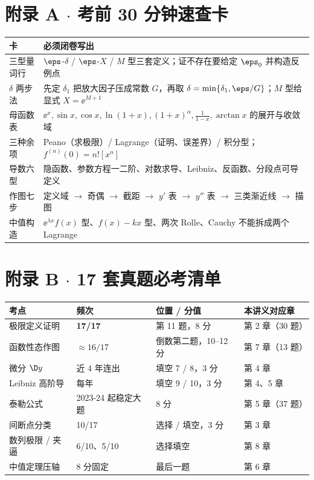 \newpage
\section*{附录 A $\cdot$ 考前 30 分钟速查卡}
{\footnotesize
\begin{longtable}{@{}p{3.0cm}p{12.2cm}@{}}
\toprule
\textbf{卡} & \textbf{必须闭卷写出} \\
\midrule
三型量词行 & $\eps$-$\delta$ / $\eps$-$X$ / $M$ 型三套定义；证不存在要给定 $\eps_0$ 并构造反例点 \\
$\delta$ 两步法 & 先定 $\delta_1$ 把放大因子压成常数 $G$，再取 $\delta=\min\{\delta_1,\eps/G\}$；$M$ 型给显式 $X=\ee^{M+1}$ \\
母函数表 & $\ee^x,\sin x,\cos x,\ln(1+x),(1+x)^\alpha,\frac1{1-x},\arctan x$ 的展开与收敛域 \\
三种余项 & Peano（求极限）/ Lagrange（证明、误差界）/ 积分型；$f^{(n)}(0)=n![x^n]$ \\
导数六型 & 隐函数、参数方程一二阶、对数求导、Leibniz、反函数、分段点可导定义 \\
作图七步 & 定义域 $\to$ 奇偶 $\to$ 截距 $\to$ $y'$ 表 $\to$ $y''$ 表 $\to$ 三类渐近线 $\to$ 描图 \\
中值构造 & $\ee^{\lambda x}f(x)$ 型、$f(x)-kx$ 型、两次 Rolle、Cauchy 不能拆成两个 Lagrange \\
\bottomrule
\end{longtable}}

\section*{附录 B $\cdot$ 17 套真题必考清单}
{\footnotesize
\begin{longtable}{@{}p{3.4cm}p{2.1cm}p{3.0cm}p{6.7cm}@{}}
\toprule
\textbf{考点} & \textbf{频次} & \textbf{位置 / 分值} & \textbf{本讲义对应章} \\
\midrule
极限定义证明 & \textbf{17/17} & 第 11 题，8 分 & 第 2 章（30 题） \\
函数性态作图 & $\approx16/17$ & 倒数第二题，10--12 分 & 第 7 章（13 题） \\
微分 $\D y$ & 近 4 年连出 & 填空 7 / 8，3 分 & 第 4 章 \\
Leibniz 高阶导 & 每年 & 填空 9 / 10，3 分 & 第 4、5 章 \\
泰勒公式 & 2023-24 起稳定大题 & 8 分 & 第 5 章（37 题） \\
间断点分类 & 10/17 & 选择 / 填空，3 分 & 第 3 章 \\
数列极限 / 夹逼 & 6/10、5/10 & 选择填空 & 第 8 章 \\
中值定理压轴 & 8 分固定 & 最后一题 & 第 6 章 \\
\bottomrule
\end{longtable}}

